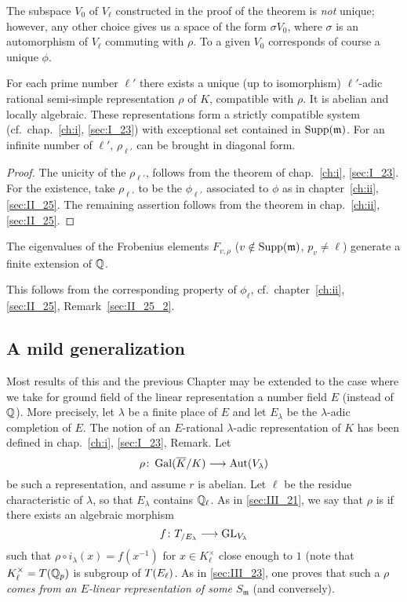 \begin{obs}
	The subspace $V_0$ of $V_\ell$ constructed in the proof of the theorem
	is \emph{not} unique; however, any other choice gives us a space of the
	form $\sigma V_0$, where $\sigma$ is an automorphism of $V_\ell$
	commuting with $\rho$. To a given $V_0$ corresponds of course a unique
	$\phi$.
\end{obs}

\begin{cor}
	For each prime number $\ell'$ there exists a unique (up to isomorphism)
	$\ell'$-adic rational semi-simple representation $\rho$ of $K$,
	compatible with $\rho$. It is abelian and locally algebraic.  These
	representations form a strictly compatible system (cf.\
	chap.~\ref{ch:i}, \ref{sec:I_23}) with exceptional set contained in
	$\operatorname{Supp}(\mathfrak{m})$. For an infinite number of $\ell'$,
	$\rho_{\ell'}$ can be brought in diagonal form.
\end{cor}
\begin{proof}
	The unicity of the $\rho_{\ell'}$, follows from the theorem of
	chap.~\ref{ch:i}, \ref{sec:I_23}. For the existence, take
	$\rho_{\ell'}$ to be the $\phi_{\ell'}$ associated to $\phi$ as
	in chapter~\ref{ch:ii}, \ref{sec:II_25}. The remaining assertion
	follows from the theorem\label{errata:III_prop_to_thm} in
	chap.~\ref{ch:ii}, \ref{sec:II_25}.
\end{proof}

\begin{cor}
	The eigenvalues of the Frobenius elements $F_{v, \rho}$ ($v \notin
	\operatorname{Supp}(\mathfrak{m})$, $p_v \ne \ell$) generate a finite extension of
	$\mathbb{Q}$.
\end{cor}
This follows from the corresponding property of $\phi_\ell$, cf.\
chapter~\ref{ch:ii}, \ref{sec:II_25}, Remark~\ref{sec:II_25_2}.%
\label{errata:III_rmk1_2}

\dpage
\subsection{A mild generalization}
\label{sec:III_24}

Most results of this and the previous Chapter may be extended to the case where
we take for ground field of the linear representation a number field $E$
(instead of $\mathbb{Q}$). More precisely, let $\lambda$ be a finite place of $E$ and
let $E_\lambda$ be the $\lambda$-adic completion of $E$. The notion of an
$E$-rational $\lambda$-adic representation of $K$ has been defined in
chap.~\ref{ch:i}, \ref{sec:I_23}, Remark.
Let
\[
	\rho \colon \operatorname{Gal}(\overline{K}/K) \longrightarrow \operatorname{Aut}(V_\lambda)
\]
be such a representation, and assume $r$ is abelian. Let $\ell$ be the residue
characteristic of $\lambda$, so that $E_\lambda$ contains $\mathbb{Q}_\ell$. As in
\ref{sec:III_21}, we say that $\rho$ is \strong{locally algebraic} if there
exists an algebraic morphism
\[
	f \colon T_{/E_\lambda} \longrightarrow \operatorname{GL}_{V_\lambda}
\]
such that $\rho \circ i_\lambda(x) = f(x^{-1})$ for $x \in K^\times_\ell$ close
enough to $1$ (note that $K^\times_\ell = T(\mathbb{Q}_p)$ is subgroup of
$T(E_\ell)$. As in \ref{sec:III_23}, one proves that such a $\rho$ \emph{comes
from an $E$-linear representation of some $S_\mathfrak{m}$} (and conversely).  

